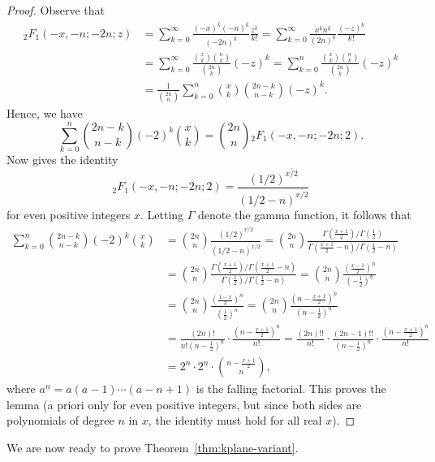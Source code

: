 \documentclass[12pt]{amsart}
\begin{document}
\begin{proof}
Observe that
\begin{align*}
{}_2F_1(-x,-n;-2n;z) &= \sum_{k=0}^{\infty} \frac{(-x)^{\overline{k}}(-n)^{\overline{k}}}{(-2n)^{\overline{k}}} \frac{z^k}{k!} = \sum_{k=0}^{\infty} \frac{x^{\underline{k}}n^{\underline{k}}}{(2n)^{\underline{k}}} \frac{(-z)^k}{k!} \\
&= \sum_{k=0}^{\infty} \frac{\binom{x}{k} \binom{n}{k}}{\binom{2n}{k}} (-z)^k = \sum_{k=0}^n \frac{\binom{x}{k} \binom{n}{k}}{\binom{2n}{k}} (-z)^k \\
&= \frac{1}{\binom{2n}{n}} \sum_{k=0}^n \binom{x}{k} \binom{2n-k}{n-k} (-z)^k.
\end{align*}
Hence, we have
$$\sum_{k=0}^n \binom{2n-k}{n-k} (-2)^k \binom{x}{k} =
\binom{2n}{n} {}_2F_1(-x,-n;-2n;2).
$$
Now \cite[p.415]{Koepf1995Algorithms} gives the identity
$${}_2F_1(-x,-n;-2n;2) = \frac{(1/2)^{\overline{x/2}}}{(1/2-n)^{\overline{x/2}}}$$
for even positive integers $x$. 
Letting $\Gamma$ denote the gamma function, it follows that
\begin{align*}
    \sum_{k=0}^n \binom{2n-k}{n-k} (-2)^k \binom{x}{k} &=  \binom{2n}{n} \frac{(1/2)^{\overline{x/2}}}{(1/2-n)^{\overline{x/2}}} = \binom{2n}{n} \frac{\Gamma(\frac{x+1}{2})/\Gamma(\frac12)}{\Gamma(\frac{x+1}{2}-n)/\Gamma(\frac12-n)} \\
    &= \binom{2n}{n} \frac{\Gamma(\frac{x+1}{2})/\Gamma(\frac{x+1}{2}-n)}{\Gamma(\frac12)/\Gamma(\frac12-n)} = \binom{2n}{n} \frac{(\frac{x-1}{2})^{\underline{n}}}{(-\frac12)^{\underline{n}}} \\
    &= \binom{2n}{n} \frac{(\frac{1-x}{2})^{\overline{n}}}{(\frac12)^{\overline{n}}} = \binom{2n}{n} \frac{(n - \frac{x+1}{2})^{\underline{n}}}{(n-\frac12)^{\underline{n}}} \\
    &= \frac{(2n)!}{n!(n-\frac12)^{\underline{n}}} \cdot \frac{(n - \frac{x+1}{2})^{\underline{n}}}{n!} = \frac{(2n)!!}{n!} \cdot \frac{(2n-1)!!}{(n-\frac12)^{\underline{n}}} \cdot \frac{(n - \frac{x+1}{2})^{\underline{n}}}{n!} \\
    &= 2^n \cdot 2^n \cdot \binom{n-\frac{x+1}{2}}{n},
\end{align*}
where $a^{\underline{n}} = a(a-1)\cdots(a-n+1)$ is the falling factorial.
This proves the lemma (a priori only for even positive integers, but since both sides are polynomials of degree $n$ in $x$, the identity must hold for all real $x$).
\end{proof}

We are now ready to prove Theorem~\ref{thm:kplane-variant}.
\end{document}
